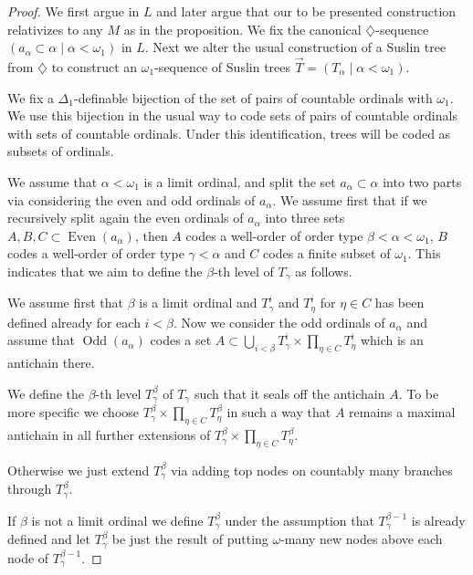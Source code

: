 \documentclass[a4paper,11pt]{article}
\begin{document}
\begin{proof}
We first argue in $L$ and later argue that our to be presented construction relativizes to any $M$ as in the proposition. We fix the canonical $\diamondsuit$-sequence $(a_{\alpha} \subset \alpha \mid \alpha< \omega_1)$ in $L$. 
Next we alter the usual construction of a Suslin tree from $\diamondsuit$ to construct an $\omega_1$-sequence of Suslin trees $\vec{T}= (T_{\alpha} \mid \alpha < \omega_1)$. 

We fix a $\Delta_1$-definable bijection of the set of pairs of countable ordinals with $\omega_1$. We use this bijection in the usual way to code sets of pairs of countable ordinals with sets of countable ordinals. Under this identification, trees will be coded as subsets of ordinals.

We assume that $\alpha< \omega_1$ is a limit ordinal, and split the set $a_{\alpha} \subset \alpha$ into two parts via considering the even and odd ordinals of $a_{\alpha}$. We assume first that if we recursively split again the even ordinals of $a_{\alpha}$ into three sets $A,B,C \subset \operatorname{Even} (a_{\alpha})$, then $A$ codes a well-order of order type $\beta < \alpha < \omega_1$, $B$ codes a well-order of order type $\gamma <\alpha$ and $C$ codes a finite subset of $\omega_1$. This indicates that we aim to define the $\beta$-th level of $T_{\gamma}$ as follows.

We assume first that $\beta$ is a limit ordinal and $T^i_{\gamma}$ and $T^i_{\eta}$ for $\eta \in C$ has been defined already for each $i < \beta$. Now we consider the odd ordinals of $a_{\alpha}$ and assume that $\operatorname{Odd} (a_{\alpha})$ codes a set $A \subset \bigcup_{i < \beta } T_{\gamma}^i \times \prod_{\eta \in C} T_{\eta}^i$ which is an antichain there.

We define the $\beta$-th level $T^{\beta}_{\gamma}$ of $T_{\gamma}$ such that it seals off the antichain $A$. To be more specific we choose $ T_{\gamma}^{\beta} \times \prod_{\eta \in C} T_{\eta}^{\beta}$ in such a way that $A$ remains a maximal antichain in all further extensions of $ T_{\gamma}^{\beta} \times \prod_{\eta \in C} T_{\eta}^{\beta}$.

Otherwise we just extend $T^{\beta}_{\gamma}$ via adding top nodes on countably many branches through $T^{\beta}_{\gamma}$.

If $\beta$ is not a limit ordinal we define $T^{\beta}_{\gamma}$ under the assumption that $T^{\beta-1}_{\gamma}$ is already defined and let $T^{\beta}_{\gamma}$ be just the result of putting $\omega$-many new nodes above each node of $T^{\beta-1}_{\gamma}$.





\end{proof}
\end{document}
